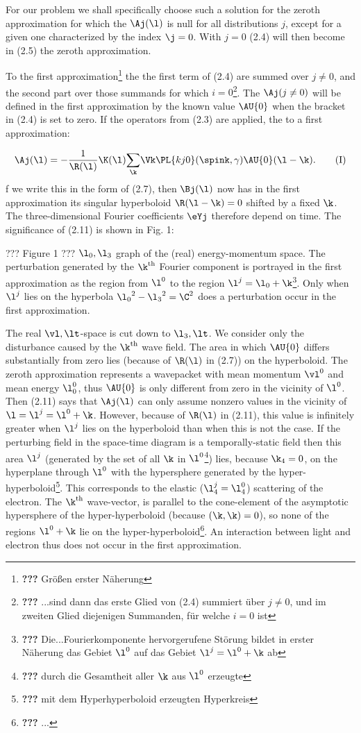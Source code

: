 \documentclass{article}
\newcommand{\WTF}[1]{\footnote{\textbf{???} #1}}
\newcommand{\nequ}[2]{
\begin{align*}
#1
\tag{#2}
\end{align*}
}
\newcommand{\inv}[1]{\frac{1}{#1}}
\newcommand{\sumX}[1]{\underset{#1}{\sum}}
\begin{document}
For our problem we shall specifically choose such a solution for the zeroth approximation for which the $\Aj(\l)$ is null for all distributions $j$, except for a given one characterized by the index $\j = 0$. With $j=0$ (2.4) will then become in (2.5) the zeroth approximation.

To the first approximation\WTF{Größen erster Näherung} the the first term of (2.4) are summed over $j \neq 0$, and the second part over those summands for which $i=0$\WTF{...sind dann das erste Glied von (2.4) summiert über $j\neq 0$, und im zweiten Glied diejenigen Summanden, für welche $i=0$ ist}. The $\Aj (j \neq 0)$ will be defined in the first approximation by the known value $\AU{0}$ when the bracket in (2.4) is set to zero. If the operators from (2.3) are applied, the to a first approximation:
\nequ{
\Aj(\l) = -\inv{\R(\l)}\K(\l)\sumX{\k}\Vk\PL{kj0}(\spink, \gamma)\AU{0}(\l-\k).
}
If we write this in the form of (2.7), then $\Bj(\l)$ now has in the first approximation its singular hyperboloid $\R(\l - \k)=0$ shifted by a fixed $\k$. The three-dimensional Fourier coefficients $\eYj$ therefore depend on time. The significance of (2.11) is shown in Fig. 1:

??? Figure 1 ???
$\l_0,\l_3$ graph of the (real) energy-momentum space. The perturbation generated by the $\k^{\text{th}}$ Fourier component is portrayed in the first approximation as the region from $\l^0$ to the region $\l^j=\l_0+\k$\WTF{Die...Fourierkomponente hervorgerufene Störung bildet in erster Näherung das Gebiet $\l^0$ auf das Gebiet $\l^j=\l^0+\k$ ab}. Only when $\l^j$ lies on the hyperbola ${\l_0}^2 - {\l_3}^2 = \C^2$ does a perturbation occur in the first approximation.

The real $\vl, \lt$-space is cut down to $\l_3,\lt$. We consider only the disturbance caused by the $\k^{\text{th}}$ wave field. The area in which $\AU{0}$ differs substantially from zero lies (because of $\R(\l)$ in (2.7)) on the hyperboloid.
The zeroth approximation represents a wavepacket with mean momentum $\vl^0$ and mean energy $\l^0_0$, thus $\AU{0}$ is only different from zero in the vicinity of $\l^0$. Then (2.11) says that $\Aj(\l)$ can only assume nonzero values in the vicinity of $\l=\l^j=\l^0+\k$. However, because of $\R(\l)$ in (2.11), this value is infinitely greater when $\l^j$ lies on the hyperboloid than when this is not the case. If the perturbing field in the space-time diagram is a temporally-static field then this area $\l^j$ (generated by the set of all $\k$ in $\l^0$\WTF{durch die Gesamtheit aller $\k$ aus $\l^0$ erzeugte}) lies, because $\k_4=0$, on the hyperplane through $\l^0$ with the hypersphere generated by the hyper-hyperboloid\WTF{mit dem Hyperhyperboloid erzeugten Hyperkreis}.
This corresponds to the elastic ($\l^j_4 = \l^0_4$) scattering of the electron. The $\k^{\text{th}}$ wave-vector, is parallel to the cone-element of the asymptotic hypersphere of the hyper-hyperboloid (because $(\k, \k)=0$), so none of the regions $\l^0+\k$ lie on the hyper-hyperboloid\WTF{...}. An interaction between light and electron thus does not occur in the first approximation.
\end{document}
